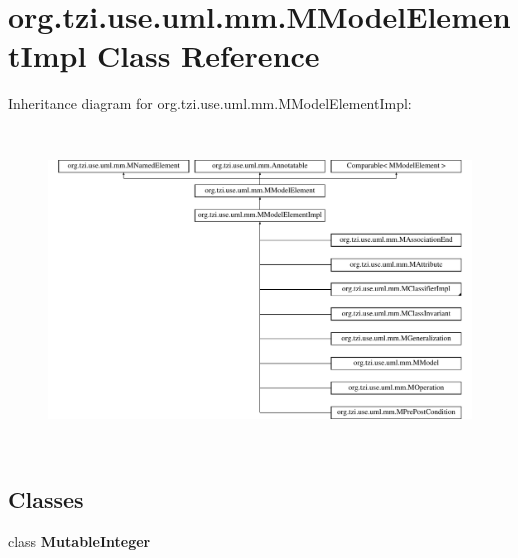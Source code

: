 \hypertarget{classorg_1_1tzi_1_1use_1_1uml_1_1mm_1_1_m_model_element_impl}{\section{org.\-tzi.\-use.\-uml.\-mm.\-M\-Model\-Element\-Impl Class Reference}
\label{classorg_1_1tzi_1_1use_1_1uml_1_1mm_1_1_m_model_element_impl}
}
Inheritance diagram for org.\-tzi.\-use.\-uml.\-mm.\-M\-Model\-Element\-Impl\-:\begin{figure}[H]
\begin{center}
\leavevmode
\includegraphics[height=8.555555cm]{classorg_1_1tzi_1_1use_1_1uml_1_1mm_1_1_m_model_element_impl}
\end{center}
\end{figure}
\subsection*{Classes}
\begin{DoxyCompactItemize}
\item 
class {\bfseries Mutable\-Integer}
\end{DoxyCompactItemize}
